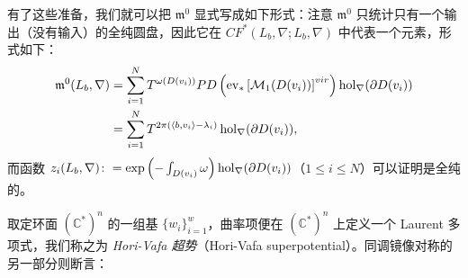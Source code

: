 
有了这些准备，我们就可以把 $\mathfrak{m}^0$ 显式写成如下形式：注意 $\mathfrak{m}^0$ 只统计只有一个输出（没有输入）的全纯圆盘，因此它在 $CF^{\ast} (L_b,\nabla;L_b,\nabla)$ 中代表一个元素，形式如下：
\begin{align*}
\mathfrak{m}^0 (L_b,\nabla)
&=\sum_{i=1}^N T^{\omega (D(v_i))}PD\left(\operatorname{ev}_{\ast}\left[\mathcal{M}_1 (D(v_i))\right]^{vir}\right)\operatorname{hol}_{\nabla} (\partial D(v_i))\\
&=\sum_{i=1}^N T^{2\pi(\langle b,v_i\rangle -\lambda_i)}\operatorname{hol}_{\nabla} (\partial D(v_i)),
\end{align*}
而函数 $z_i(L_b,\nabla)\colon =\exp\left(-\int_{D(v_i)}\omega\right)\operatorname{hol}_{\nabla} (\partial D(v_i))$（$1\leq i\leq N$）可以证明是全纯的。




取定环面 $\left(\mathbb{C}^{\ast}\right)^n$ 的一组基 $\{w_i\}_{i=1}^w$，曲率项便在 $\left(\mathbb{C}^{\ast}\right)^n$ 上定义一个 Laurent 多项式，我们称之为 \emph{Hori-Vafa 超势}（Hori-Vafa superpotential）。同调镜像对称的另一部分则断言：


